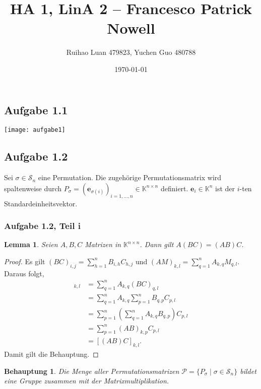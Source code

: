 \documentclass[draft,a5paper]{article}
\author{Ruihao Luan 479823, Yuchen Guo 480788}
\date{\today}
\title{HA 1, LinA 2 -- Francesco Patrick Nowell}
\newtheorem*{beh}{Behauptung}
\newtheorem*{lem}{Lemma}
\begin{document}
\maketitle

\newpage

\subsection*{Aufgabe 1.1}

\texttt{[image: aufgabe1]}

\newpage

\subsection*{Aufgabe 1.2}

Sei \(\sigma \in \mathcal{S}_{n}\) eine Permutation.  Die zugehörige Permutationsmatrix
wird spaltenweise durch \(P_{\sigma} = (\mathbf{e}_{\sigma(i)})_{i = 1, \ldots, n} \in
\mathbb{K}^{n \times n}\) definiert.  \(\mathbf{e}_{i} \in \mathbb{K}^{n}\)
ist der \(i\)-ten Standardeinheitsvektor.

\subsubsection*{Aufgabe 1.2, Teil i}

\begin{lem}
  Seien \(A, B, C\) Matrizen in \( \mathbb{K}^{n \times n}\).  Dann gilt \(
  A(BC) = (AB)C \).
\end{lem}

\begin{proof}
  Es gilt \((BC)_{i,j} = \sum_{h = 1}^{n}{B_{i,h} C_{h,j}}\) und
  \((AM)_{k,l} = \sum_{q = 1}^{n}{A_{k,q} M_{q,l}}\).  Daraus folgt,
  \begin{align*}
    [A(BC)]_{k,l}
    &= \sum_{q=1}^{n}{A_{k,q}(BC)_{q,l}} \\
    &= \sum_{q=1}^{n}{A_{k,q}\sum_{p=1}^{n}{B_{q,p}C_{p,l}}} \\
    &= \sum_{p=1}^{n}{\left(\sum_{q=1}^{n}{A_{k,q}B_{q,p}}\right)C_{p,l}} \\
    &= \sum_{p=1}^{n}{(AB)_{k,p}C_{p,l}} \\
    &= [(AB)C]_{k,l}.
  \end{align*}
  Damit gilt die Behauptung.
\end{proof}

\begin{beh}
  Die Menge aller Permutationsmatrizen \(\mathcal{P} = \{ P_{\sigma} \mid \sigma \in
  \mathcal{S}_{n}\}\) bildet eine Gruppe zusammen mit der Matrixmultiplikation.
\end{beh}
\end{document}
